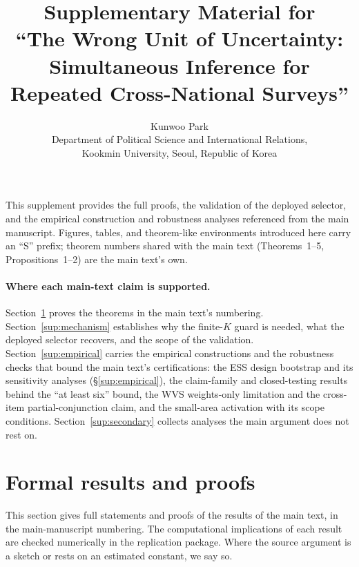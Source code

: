 \documentclass[12pt]{article}
\title{Supplementary Material for\\
``The Wrong Unit of Uncertainty:\\
Simultaneous Inference for Repeated Cross-National Surveys''}
\author{Kunwoo Park\\
\small Department of Political Science and International Relations,\\
\small Kookmin University, Seoul, Republic of Korea}
\date{}
\theoremstyle{definition}
\theoremstyle{remark}
\begin{document}
\maketitle

This supplement provides the full proofs, the validation of the deployed
selector, and the empirical construction and robustness analyses referenced
from the main manuscript. Figures, tables, and theorem-like environments
introduced here carry an ``S'' prefix; theorem numbers shared with the main
text (Theorems~1--5, Propositions~1--2) are the main text's own.

\paragraph{Where each main-text claim is supported.}
Section~\ref{sup:proofs} proves the theorems in the main text's numbering.
Section~\ref{sup:mechanism} establishes why the finite-$K$ guard is needed,
what the deployed selector recovers, and the scope of the validation.
Section~\ref{sup:empirical} carries the empirical constructions and the
robustness checks that bound the main text's certifications: the ESS design
bootstrap and its sensitivity analyses (\S\ref{sup:empirical}), the
claim-family and closed-testing results behind the ``at least six'' bound,
the WVS weights-only limitation and the cross-item partial-conjunction
claim, and the small-area activation with its scope conditions.
Section~\ref{sup:secondary} collects analyses the main argument does not
rest on.

\section{Formal results and proofs}\label{sup:proofs}

This section gives full statements and proofs of the results of the main text, in the
main-manuscript numbering. The computational implications of each result are
checked numerically in the replication package. Where the source
argument is a sketch or rests on an estimated constant, we say so.
\end{document}
